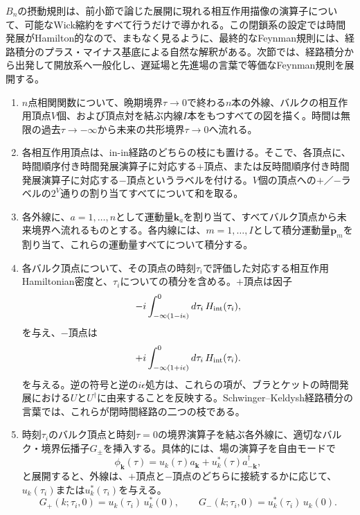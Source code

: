 \documentclass[a4paper,11pt,oneside]{article}
\theoremstyle{definition}
\numberwithin{equation}{section}
\begin{document}
\(B_n\)の摂動規則は、前小節で論じた展開に現れる相互作用描像の演算子について、可能なWick縮約をすべて行うだけで導かれる。この閉鎖系の設定では時間発展がHamilton的なので、まもなく見るように、最終的なFeynman規則には、経路積分のプラス・マイナス基底による自然な解釈がある。次節では、経路積分から出発して開放系へ一般化し、遅延場と先進場の言葉で等価なFeynman規則を展開する。



\begin{enumerate}
\item
\(n\)点相関関数について、晩期境界\(\tau\to 0\)で終わる\(n\)本の外線、バルクの相互作用頂点\(V\)個、および頂点対を結ぶ内線\(I\)本をもつすべての図を描く。時間は無限の過去\(\tau\to-\infty\)から未来の共形境界\(\tau\to 0\)へ流れる。



\item
各相互作用頂点は、in-in経路のどちらの枝にも置ける。そこで、各頂点に、時間順序付き時間発展演算子に対応する\(+\)頂点、または反時間順序付き時間発展演算子に対応する\(-\)頂点というラベルを付ける。\(V\)個の頂点への\(+\)／\(-\)ラベルの\(2^V\)通りの割り当てすべてについて和を取る。



\item
各外線に、\(a=1,\dots,n\)として運動量\(\mathbf k_a\)を割り当て、すべてバルク頂点から未来境界へ流れるものとする。各内線には、\(m=1,\dots,I\)として積分運動量\(\mathbf p_m\)を割り当て、これらの運動量すべてについて積分する。



\item
各バルク頂点について、その頂点の時刻\(\tau_i\)で評価した対応する相互作用Hamiltonian密度と、\(\tau_i\)についての積分を含める。\(+\)頂点は因子
\begin{equation}
-i\int_{-\infty(1-i\epsilon)}^0 d\tau_i\, H_{\rm int}(\tau_i),
\end{equation}
を与え、\(-\)頂点は
\begin{equation}
+i\int_{-\infty(1+i\epsilon)}^0 d\tau_i\, H_{\rm int}(\tau_i).
\end{equation}
を与える。逆の符号と逆の\(i\epsilon\)処方は、これらの項が、ブラとケットの時間発展における$ U$と$ U^{\dagger}$に由来することを反映する。Schwinger--Keldysh経路積分の言葉では、これらが閉時間経路の二つの枝である。



\item
時刻\(\tau_i\)のバルク頂点と時刻\(\tau=0\)の境界演算子を結ぶ各外線に、適切なバルク・境界伝播子$  G_{\pm} $を挿入する。具体的には、場の演算子を自由モードで
\begin{equation}
\phi_{\mathbf k}(\tau)=u_k(\tau)a_{\mathbf k}+u_k^*(\tau)a^\dagger_{-\mathbf k},
\end{equation}
と展開すると、外線は、\(+\)頂点と\(-\)頂点のどちらに接続するかに応じて、\(u_k(\tau_i)\)または\(u_k^*(\tau_i)\)を与える。
\begin{equation}
G_+(k;\tau_i,0)=u_k(\tau_i)\,u_k^*(0),
\qquad
G_-(k;\tau_i,0)=u_k^*(\tau_i)\,u_k(0) .
\end{equation}




\end{enumerate}
\end{document}
